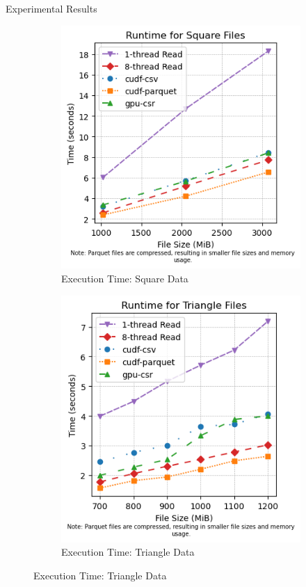 \documentclass{beamer}
\begin{document}
\begin{frame}{Experimental Results}
 \begin{figure}[h!]
  \centering
  \begin{subfigure}[b]{0.45\linewidth}
    \centering
    \includegraphics[width=\linewidth]{time_square.png}
    \caption{Execution Time: Square Data}
    \label{fig:time_square}
  \end{subfigure}
  \hfill
  \begin{subfigure}[b]{0.45\linewidth}
    \centering
    \includegraphics[width=\linewidth]{time_triangle.png}
    \caption{Execution Time: Triangle Data}
    \label{fig:time_triangle}
  \end{subfigure}
  

\end{figure}
\end{frame}
\end{document}
